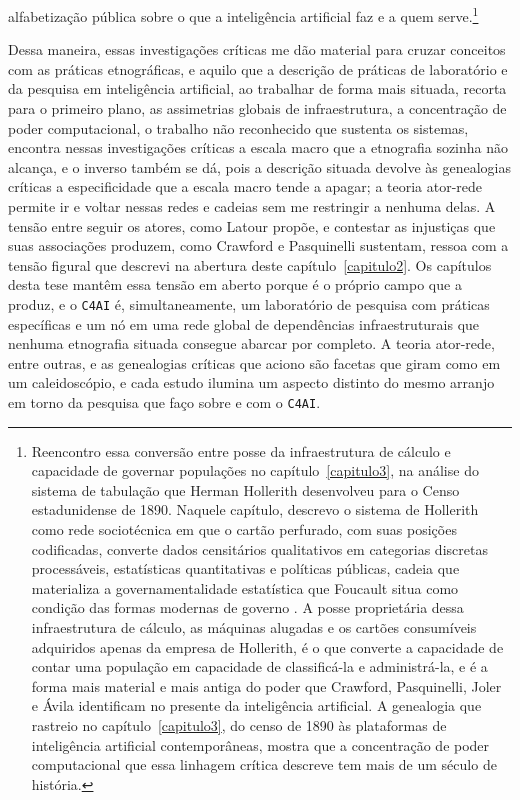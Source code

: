 alfabetização pública sobre o que a inteligência artificial faz e a quem serve.\footnote{Reencontro essa conversão entre posse da infraestrutura de cálculo e capacidade de governar populações no capítulo~\ref{capitulo3}, na análise do sistema de tabulação que Herman Hollerith desenvolveu para o Censo estadunidense de 1890. Naquele capítulo, descrevo o sistema de Hollerith como rede sociotécnica em que o cartão perfurado, com suas posições codificadas, converte dados censitários qualitativos em categorias discretas processáveis, estatísticas quantitativas e políticas públicas, cadeia que materializa a governamentalidade estatística que Foucault situa como condição das formas modernas de governo \parencite{Foucault2008Seguranca}. A posse proprietária dessa infraestrutura de cálculo, as máquinas alugadas e os cartões consumíveis adquiridos apenas da empresa de Hollerith, é o que converte a capacidade de contar uma população em capacidade de classificá-la e administrá-la, e é a forma mais material e mais antiga do poder que Crawford, Pasquinelli, Joler e Ávila identificam no presente da inteligência artificial. A genealogia que rastreio no capítulo~\ref{capitulo3}, do censo de 1890 às plataformas de inteligência artificial contemporâneas, mostra que a concentração de poder computacional que essa linhagem crítica descreve tem mais de um século de história.}

Dessa maneira, essas investigações críticas me dão material para cruzar conceitos com as práticas etnográficas, e aquilo que a descrição de práticas de laboratório e da pesquisa em inteligência artificial, ao trabalhar de forma mais situada, recorta para o primeiro plano, as assimetrias globais de infraestrutura, a concentração de poder computacional, o trabalho não reconhecido que sustenta os sistemas, encontra nessas investigações críticas a escala macro que a etnografia sozinha não alcança, e o inverso também se dá, pois a descrição situada devolve às genealogias críticas a especificidade que a escala macro tende a apagar; a teoria ator-rede permite ir e voltar nessas redes e cadeias sem me restringir a nenhuma delas. A tensão entre seguir os atores, como Latour propõe, e contestar as injustiças que suas associações produzem, como Crawford e Pasquinelli sustentam, ressoa com a tensão figural que descrevi na abertura deste capítulo~\ref{capitulo2}. Os capítulos desta tese mantêm essa tensão em aberto porque é o próprio campo que a produz, e o \texttt{C4AI} é, simultaneamente, um laboratório de pesquisa com práticas específicas e um nó em uma rede global de dependências infraestruturais que nenhuma etnografia situada consegue abarcar por completo. A teoria ator-rede, entre outras, e as genealogias críticas que aciono são facetas que giram como em um caleidoscópio, e cada estudo ilumina um aspecto distinto do mesmo arranjo em torno da pesquisa que faço sobre e com o \texttt{C4AI}.

